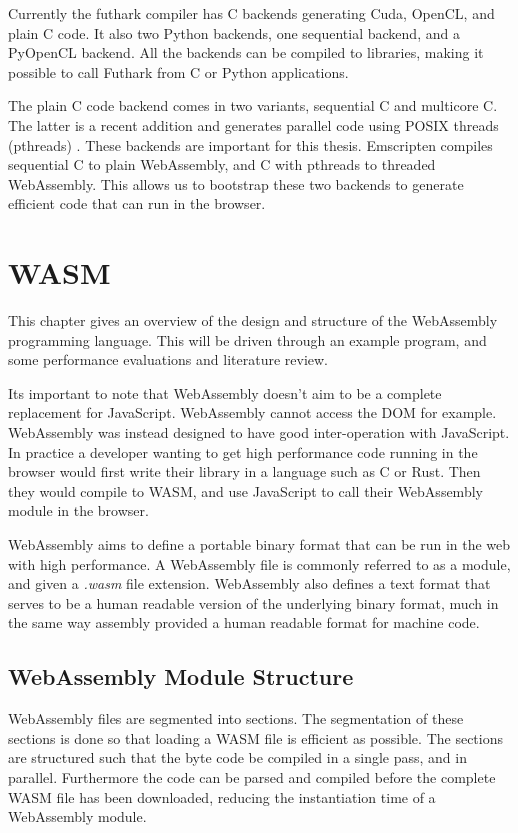 \documentclass[11pt]{book}
\begin{document}
Currently the futhark compiler has C backends generating Cuda, OpenCL, and plain C code. It also two Python backends, one sequential backend, and a PyOpenCL backend. All the backends can be compiled to libraries, making it possible to call Futhark from C or Python applications. 

The plain C code backend comes in two variants, sequential C and multicore C. The latter is a recent addition and generates parallel code using POSIX threads (pthreads) \cite{multicore}. These backends are important for this thesis. Emscripten compiles sequential C to plain WebAssembly, and C with pthreads to threaded WebAssembly. This allows us to bootstrap these two backends to generate efficient code that can run in the browser. 


\chapter{WASM}
This chapter gives an overview of the design and structure of the WebAssembly programming language. This will be driven through an example program, and some performance evaluations and literature review. 



Its important to note that WebAssembly doesn't aim to be a complete replacement for JavaScript. WebAssembly cannot access the DOM for example. WebAssembly was instead designed to have good inter-operation with JavaScript. In practice a developer wanting to get high performance code running in the browser would first write their library in a language such as C or Rust. Then they would compile to WASM, and use JavaScript to call their WebAssembly module in the browser. 




WebAssembly aims to define a portable binary format that can be run in the web with high performance. A WebAssembly file is commonly referred to as a module, and given a \textit{.wasm} file extension. WebAssembly also defines a text format that serves to be a human readable version of the underlying binary format, much in the same way assembly provided a human readable format for machine code. 



\section{WebAssembly Module Structure}

WebAssembly files are segmented into sections. The segmentation of these sections is done so that loading a WASM file is efficient as possible. The sections are structured such that the byte code be compiled in a single pass, and in parallel. Furthermore the code can be parsed and compiled before the complete WASM file has been downloaded, reducing the instantiation time of a WebAssembly module. 
\end{document}
